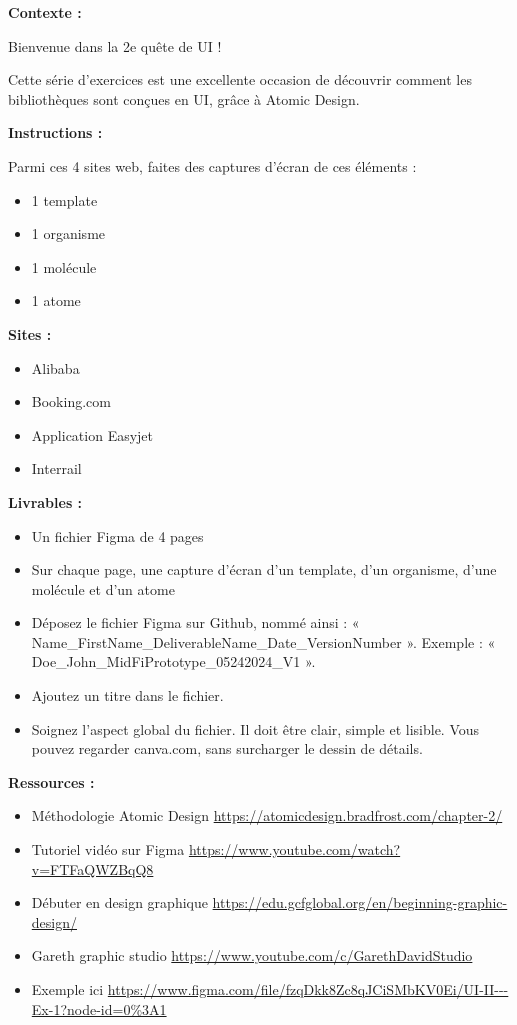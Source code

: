 \makeheaderfiles

\textbf{Contexte :}

Bienvenue dans la 2e quête de UI !

Cette série d'exercices est une excellente occasion de découvrir comment les bibliothèques sont conçues en UI, grâce à Atomic Design.

\textbf{Instructions :}

Parmi ces 4 sites web, faites des captures d'écran de ces éléments :

\begin{itemize}
\item 1 template
\item 1 organisme
\item 1 molécule
\item 1 atome
\end{itemize}

\textbf{Sites :}

\begin{itemize}
\item Alibaba
\item Booking.com
\item Application Easyjet
\item Interrail
\end{itemize}

\textbf{Livrables :}

\begin{itemize}
\item Un fichier Figma de 4 pages
\item Sur chaque page, une capture d'écran d'un template, d'un organisme, d'une molécule et d'un atome
\item Déposez le fichier Figma sur Github, nommé ainsi : « Name\_FirstName\_DeliverableName\_Date\_VersionNumber ». Exemple : « Doe\_John\_MidFiPrototype\_05242024\_V1 ».
\item Ajoutez un titre dans le fichier.
\item Soignez l'aspect global du fichier. Il doit être clair, simple et lisible. Vous pouvez regarder canva.com, sans surcharger le dessin de détails.
\end{itemize}

\textbf{Ressources :}

\begin{itemize}
\item Méthodologie Atomic Design \url{https://atomicdesign.bradfrost.com/chapter-2/}
\item Tutoriel vidéo sur Figma \url{https://www.youtube.com/watch?v=FTFaQWZBqQ8}
\item Débuter en design graphique \url{https://edu.gcfglobal.org/en/beginning-graphic-design/}
\item Gareth graphic studio \url{https://www.youtube.com/c/GarethDavidStudio}
\item Exemple ici \url{https://www.figma.com/file/fzqDkk8Zc8qJCiSMbKV0Ei/UI-II---Ex-1?node-id=0%3A1}
\end{itemize}

